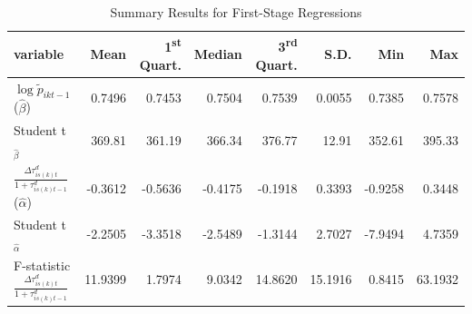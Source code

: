 \documentclass[a4paper,11pt]{article}
\begin{document}
\begin{table}[htbp]\centering
\caption{Summary Results for First-Stage Regressions\label{tab: FS_HS10}}
\begin{tabular} {@{} l r r r r r r r @{}} \\ \hline
\textbf{variable } & \textbf{Mean} & \textbf{1\textsuperscript{st} Quart.} & \textbf{Median} & \textbf{3\textsuperscript{rd} Quart.} & \textbf{ S.D.} & \textbf{Min} & \textbf{Max} \\
\hline
$\log \widetilde{p}_{ikt-1}$ ($\widehat{\beta}$) &     0.7496 &     0.7453 &     0.7504 &     0.7539 &     0.0055 &     0.7385 &     0.7578 \\
Student t$_{\widehat{\beta}}$  &   369.81 &   361.19 &   366.34 &   376.77 &    12.91 &   352.61 &   395.33 \\
$\frac{\Delta \tau^d_{is(k)t}}{1+\tau_{is(k)t-1}^d}$ ($\widehat{\alpha}$)  &    -0.3612 &    -0.5636 &    -0.4175 &    -0.1918 &     0.3393 &    -0.9258 &     0.3448 \\
 Student t$_{\widehat{\alpha}}$   &    -2.2505 &    -3.3518 &    -2.5489 &    -1.3144 &     2.7027 &    -7.9494 &     4.7359 \\
 F-statistic $\frac{\Delta \tau^d_{is(k)t}}{1+\tau_{is(k)t-1}^d}$ &    11.9399 &     1.7974 &     9.0342 &    14.8620 &    15.1916 &     0.8415 &    63.1932 \\
\hline
\end{tabular}
\end{table}
\end{document}
